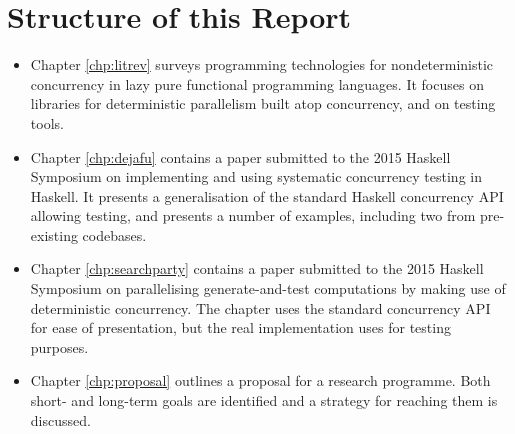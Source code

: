 \section{Structure of this Report}
\label{sec:intro-outline}

\begin{itemize}
  \item Chapter \ref{chp:litrev} surveys programming technologies for
    nondeterministic concurrency in lazy pure functional programming
    languages. It focuses on libraries for deterministic parallelism
    built atop concurrency, and on testing tools.

  \item Chapter \ref{chp:dejafu} contains a paper submitted to the
    2015 Haskell Symposium\cite{dejafu} on implementing and using
    systematic concurrency testing in Haskell. It presents a
    generalisation of the standard Haskell concurrency API allowing
    testing, and presents a number of examples, including two from
    pre-existing codebases.

  \item Chapter \ref{chp:searchparty} contains a paper submitted to
    the 2015 Haskell Symposium\cite{searchparty} on parallelising
    generate-and-test computations by making use of deterministic
    concurrency. The chapter uses the standard concurrency API for
    ease of presentation, but the real implementation uses \dejafu{}
    for testing purposes.

  \item Chapter \ref{chp:proposal} outlines a proposal for a research
    programme. Both short- and long-term goals are identified and a
    strategy for reaching them is discussed.
\end{itemize}
